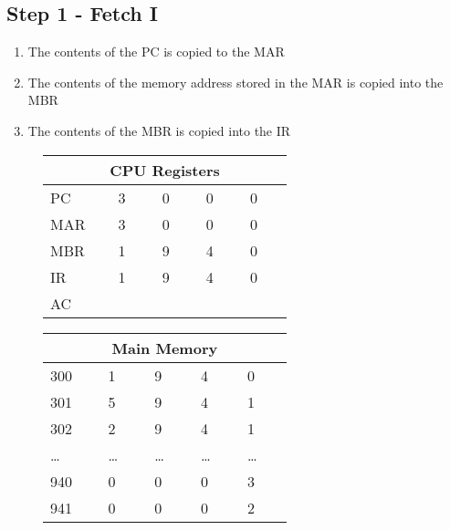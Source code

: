 \subsection*{Step 1 - Fetch I}
\begin{enumerate}
    \item The contents of the PC is copied to the MAR
    \item The contents of the memory address stored in the MAR is copied into the MBR
    \item The contents of the MBR is copied into the IR
\end{enumerate}
\begin{figure}[H]
    \begin{minipage}[t]{0.45\textwidth}
        \centering
        \begin{tabular}[H]{p{0.15\linewidth} p{0.12\linewidth} p{0.12\linewidth} p{0.12\linewidth} p{0.12\linewidth}}
            \multicolumn{5}{c}{\textbf{CPU Registers}}\\
            \hline
            \hline
            PC & 3 & 0 & 0 & 0 \\
            \hline
            MAR & 3 & 0 & 0 & 0 \\
            \hline
            MBR & 1 & 9 & 4 & 0 \\
            \hline
            IR & 1 & 9 & 4 & 0 \\
            \hline
            AC &  &  &  &  \\
            \hline
        \end{tabular}
    \end{minipage}\hfill
    \begin{minipage}[t]{0.45\textwidth}
        \centering
        \begin{tabular}[H]{p{0.15\linewidth} p{0.12\linewidth} p{0.12\linewidth} p{0.12\linewidth} p{0.12\linewidth}}
            \multicolumn{5}{c}{\textbf{Main Memory}}\\
            \hline
            \hline
            300 & 1 & 9 & 4 & 0 \\
            \hline
            301 & 5 & 9 & 4 & 1 \\
            \hline
            302 & 2 & 9 & 4 & 1 \\
            \hline
            \ldots & \ldots & \ldots & \ldots & \ldots \\
            \hline
            940 & 0 & 0 & 0 & 3 \\
            \hline
            941 & 0 & 0 & 0 & 2 \\
            \hline
        \end{tabular}
    \end{minipage}\hfill
\end{figure}


